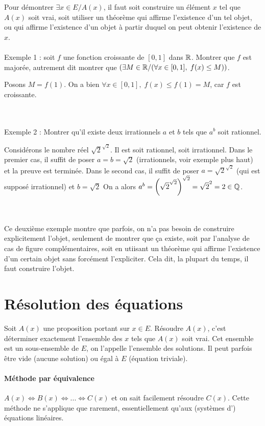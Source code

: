 {Pour démontrer \og$\exists x\in E\slash A(x)$, il faut soit construire un élément $x$ tel que $A(x)$ soit vrai, soit utiliser un théorème qui affirme l'existence d'un tel objet, ou qui affirme l'existence d'un objet à partir duquel on peut obtenir l'existence de $x$.\\
\\
Exemple 1 : soit $f$ une fonction croissante de $[0,1]$ dans $\mathbb{R}$. Montrer que $f$ est majorée, autrement dit montrer que $(\exists M\in\mathbb{R}\slash (\forall x\in[0,1],\;f(x)\leq M))$.\\
\begin{red}
Posons $M = f(1)$. On a bien $\forall x\in[0,1],\;f(x)\leq f(1)= M$, car $f$ est croissante.\end{red}\\
\\
Exemple 2 : Montrer qu'il existe deux irrationnels $a$ et $b$ tels que $a^b$ soit rationnel.\\
\begin{red} Considérons le nombre réel $\sqrt{2}^{\sqrt{2}}$. Il est soit rationnel, soit irrationnel. Dans le premier cas, il suffit de poser $a=b=\sqrt{2}$ (irrationnels, voir exemple plus haut) et la preuve est terminée. Dans le second cas, il suffit de poser $a=\sqrt{2}^{\sqrt{2}}$ (qui est supposé irrationnel) et $b=\sqrt{2}$ On a alors $a^b = \left(\sqrt{2}^{\sqrt{2}}\right)^{\sqrt{2}} = \sqrt{2}^2 = 2 \in \mathbb{Q}$.\end{red}\\
\\
Ce deuxième exemple montre que parfois, on n'a pas besoin de construire explicitement l'objet, seulement de montrer que ça existe, soit par l'analyse de cas de figure complémentaires, soit en utiisant un théorème qui affirme l'existence d'un certain objet sans forcément l'expliciter. Cela dit, la plupart du temps, il faut construire l'objet.


\section{Résolution des équations}

Soit $A(x)$ une proposition portant sur $x\in E$. Résoudre $A(x)$, c'est déterminer exactement l'ensemble des $x$ tels que $A(x)$ soit vrai. Cet ensemble est un sous-ensemble de $E$, on l'appelle l'ensemble des solutions. Il peut parfois être vide (aucune solution) ou égal à $E$ (équation triviale).


\paragraph{Méthode par équivalence}$ $\\
$A(x) \Leftrightarrow B(x) \Leftrightarrow ... \Leftrightarrow C(x)$ et on sait facilement résoudre $C(x)$. Cette méthode ne  s'applique que rarement, essentiellement qu'aux (systèmes d') équations linéaires.

}
